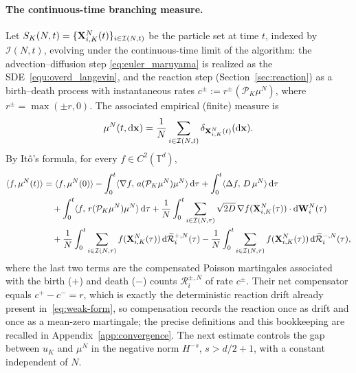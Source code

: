 \documentclass[a4paper,fleqn]{cas-sc}
\theoremstyle{definition}
\theoremstyle{remark}
\begin{document}
\paragraph{The continuous-time branching measure.}
Let $S_K(N,t)=\{\mathbf{X}^N_{i,K}(t)\}_{i\in\mathcal I(N,t)}$ be the particle set at time
$t$, indexed by $\mathcal I(N,t)$, evolving under the continuous-time limit of the
algorithm: the advection--diffusion step \eqref{eq:euler_maruyama} is realized as
the SDE~\eqref{equ:overd_langevin}, and the reaction step
(Section~\ref{sec:reaction}) as a birth--death process with instantaneous rates
$c^\pm:=r^\pm(\mathcal P_K\mu^N)$, where $r^\pm=\max(\pm r,0)$. The associated
empirical (finite) measure is
\[
\mu^N(t,\mathrm{d}\mathbf{x})=\frac1N\sum_{i\in\mathcal I(N,t)}\delta_{\mathbf{X}^N_{i,K}(t)}(\mathrm{d}\mathbf{x}).
\]
By It\^o's formula, for every $f\in C^2(\mathbb T^d)$,
\begin{equation}\label{eq:weak-form}
\begin{aligned}
\langle f,\mu^N(t)\rangle
&= \langle f,\mu^N(0)\rangle
 - \int_0^t \langle\nabla f,\,a(\mathcal P_K\mu^N)\mu^N\rangle\,\mathrm{d}\tau
 + \int_0^t \langle\Delta f,\,D\,\mu^N\rangle\,\mathrm{d}\tau\\
&\quad + \int_0^t \langle f,\,r(\mathcal P_K\mu^N)\mu^N\rangle\,\mathrm{d}\tau
 + \frac1N\int_0^t\sum_{i\in\mathcal I(N,\tau)}\sqrt{2D}\,
   \nabla f(\mathbf{X}_{i,K}^N(\tau))\cdot\mathrm{d}\mathbf{W}^N_i(\tau)\\
&\quad + \frac1N\int_0^t\sum_{i\in\mathcal I(N,\tau)}
   f(\mathbf{X}_{i,K}^N(\tau))\,\mathrm{d}\widetilde{\mathcal R}^{+,N}_i(\tau)
 - \frac1N\int_0^t\sum_{i\in\mathcal I(N,\tau)}
   f(\mathbf{X}_{i,K}^N(\tau))\,\mathrm{d}\widetilde{\mathcal R}^{-,N}_i(\tau),
\end{aligned}
\end{equation}
where the last two terms are the compensated Poisson martingales associated with the
birth ($+$) and death ($-$) counts $\mathcal R^{\pm,N}_i$ of rate $c^\pm$. Their
net compensator equals $c^+-c^-=r$, which is exactly the deterministic reaction
drift already present in~\eqref{eq:weak-form}, so compensation records the reaction
once as drift and once as a mean-zero martingale; the precise definitions and this
bookkeeping are recalled in Appendix~\ref{app:convergence}. The next estimate
controls the gap between $u_K$ and $\mu^N$ in the negative norm $H^{-s}$,
$s>d/2+1$, with a constant independent of $N$.
\end{document}

